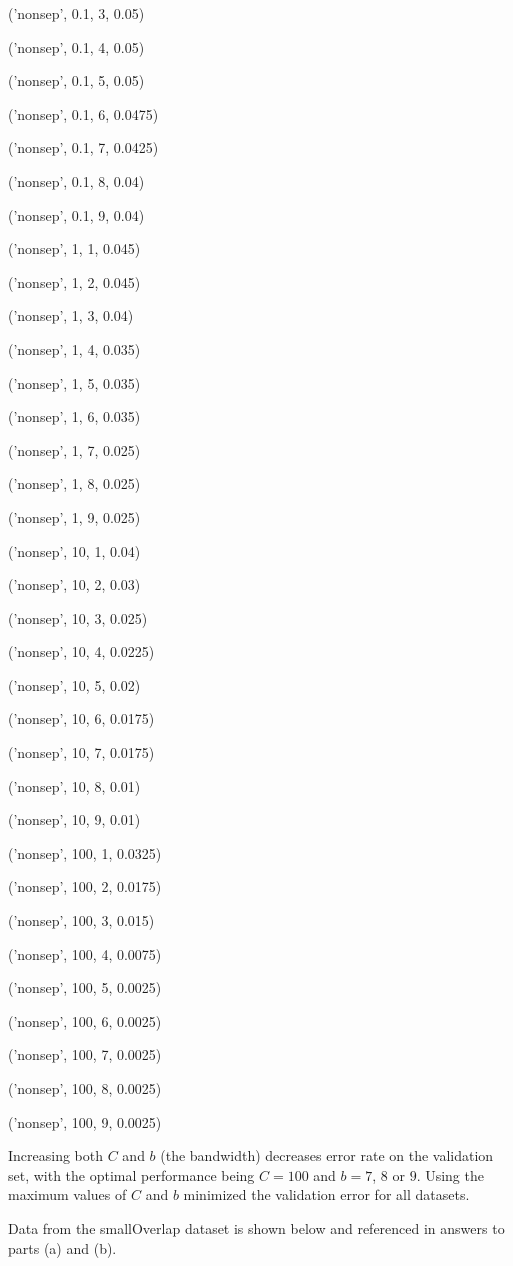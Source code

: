 \documentclass{paper}
\begin{document}
\begin{enumerate}
('nonsep', 0.1, 3, 0.05)

('nonsep', 0.1, 4, 0.05)

('nonsep', 0.1, 5, 0.05)

('nonsep', 0.1, 6, 0.0475)

('nonsep', 0.1, 7, 0.0425)

('nonsep', 0.1, 8, 0.04)

('nonsep', 0.1, 9, 0.04)

('nonsep', 1, 1, 0.045)

('nonsep', 1, 2, 0.045)

('nonsep', 1, 3, 0.04)

('nonsep', 1, 4, 0.035)

('nonsep', 1, 5, 0.035)

('nonsep', 1, 6, 0.035)

('nonsep', 1, 7, 0.025)

('nonsep', 1, 8, 0.025)

('nonsep', 1, 9, 0.025)

('nonsep', 10, 1, 0.04)

('nonsep', 10, 2, 0.03)

('nonsep', 10, 3, 0.025)

('nonsep', 10, 4, 0.0225)

('nonsep', 10, 5, 0.02)

('nonsep', 10, 6, 0.0175)

('nonsep', 10, 7, 0.0175)

('nonsep', 10, 8, 0.01)

('nonsep', 10, 9, 0.01)

('nonsep', 100, 1, 0.0325)

('nonsep', 100, 2, 0.0175)

('nonsep', 100, 3, 0.015)

('nonsep', 100, 4, 0.0075)

('nonsep', 100, 5, 0.0025)

('nonsep', 100, 6, 0.0025)

('nonsep', 100, 7, 0.0025)

('nonsep', 100, 8, 0.0025)

('nonsep', 100, 9, 0.0025)



    Increasing both $C$ and $b$ (the bandwidth) decreases error rate on the validation set, with the optimal performance being $C=100$ and $b=7$, $8$ or $9$. Using the maximum values of $C$ and $b$ minimized the validation error for all datasets.

    Data from the smallOverlap dataset is shown below and referenced in answers to parts (a) and (b).


\end{enumerate}
\end{document}
